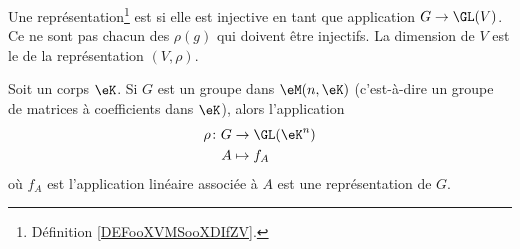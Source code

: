 \begin{definition}
    Une représentation\footnote{Définition \ref{DEFooXVMSooXDIfZV}.} est  si elle est injective en tant que application \( G\to \GL(V)\). Ce ne sont pas chacun des \( \rho(g)\) qui doivent être injectifs. La dimension de \( V\) est le  de la représentation \( (V,\rho)\).
\end{definition}

\begin{proposition}     \label{PROPooHNQOooSzeEFG}
    Soit un corps \( \eK\). Si \( G\) est un groupe dans \( \eM(n,\eK)\) (c'est-à-dire un groupe de matrices à coefficients dans \( \eK\)), alors l'application
    \begin{equation}
        \begin{aligned}
                \rho\colon G&\to \GL(\eK^n) \\
            A&\mapsto f_A 
        \end{aligned}
    \end{equation}
    où \( f_A\) est l'application linéaire associée à \( A\) est une représentation de \( G\).
\end{proposition}


